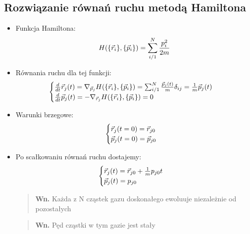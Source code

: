 \subsection{Rozwiązanie równań ruchu metodą Hamiltona}
\begin{itemize}
\item Funkcja Hamiltona:
\begin{equation}H(\{\vec{r}_i\},\{\vec{p}_i\})=\sum_{i/1}^{N}\frac{p_i^2}{2m}\end{equation}
\item Równania ruchu dla tej funkcji:
\begin{equation}\begin{cases} \frac{d}{dt} \vec{r}_j(t)=\nabla_{\vec{p}_j} H(\{\vec{r}_i\},\{\vec{p}_i\})=\sum_{i/1}^{N}\frac{\vec{p}_j(t)}{m}\delta_{ij}=\frac{1}{m}\vec{p}_j(t)\\ \frac{d}{dt}\vec{p}_j(t)=-\nabla_{\vec{r}_j} H(\{\vec{r}_i\},\{\vec{p}_i\})=0\end{cases}\end{equation} 
\item Warunki brzegowe:
\begin{equation}\begin{cases} \vec{r}_j(t=0)=\vec{r}_{j0} \\ \vec{p}_j(t=0)=\vec{p}_{j0}\end{cases}\end{equation}
\item Po scałkowaniu równań ruchu dostajemy:
\begin{equation}\begin{cases} \vec{r}_j(t)=\vec{r}_{j0}+\frac{1}{m}p_{j0}t\\ \vec{p}_j(t)=p_{j0}\end{cases} \label{RRuchu}\end{equation}
\begin{verse}\textbf{Wn.} Każda z N cząstek gazu doskonałego ewoluuje niezależnie od pozostałych\end{verse}
\begin{verse}\textbf{Wn.} Pęd cząstki w tym gazie jest stały \end{verse}
\end{itemize}
